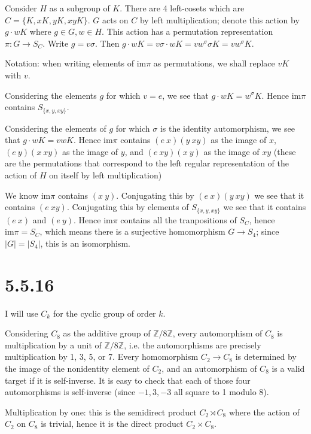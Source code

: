 \documentclass{article}
\def\Z{\mathbb{Z}}
\def\im{\textrm{im}}
\begin{document}
Consider $H$ as a subgroup of $K$. There are 4 left-cosets which are $C = \{K, xK, yK, xyK\}$. $G$ acts on $C$ by left multiplication; denote this action by $g \cdot wK$ where $g \in G, w \in H$. This action has a permutation representation $\pi : G \to S_C$. Write $g = v \sigma$. Then $g \cdot wK = v \sigma \cdot wK = vw^\sigma \sigma K = vw^\sigma K$. 

Notation: when writing elements of $\im \pi$ as permutations, we shall replace $vK$ with $v$.

Considering the elements $g$ for which $v = e$, we see that $g \cdot wK = w^\sigma K$. Hence $\im \pi$ contains $S_{\{x, y, xy\}}$.

Considering the elements of $g$ for which $\sigma$ is the identity automorphism, we see that $g \cdot wK = vwK$. Hence $\im \pi$ contains $(e\ x)(y\ xy)$ as the image of $x$, $(e\ y)(x\ xy)$ as the image of $y$, and $(e\ xy)(x\ y)$ as the image of $xy$ (these are the permutations that correspond to the left regular representation of the action of $H$ on itself by left multiplication)

We know $\im \pi$ contains $(x\ y)$. Conjugating this by $(e\ x)(y\ xy)$ we see that it contains $(e\ xy)$. Conjugating this by elements of $S_{\{x, y, xy\}}$ we see that it contains $(e\ x)$ and $(e\ y)$. Hence $\im \pi$ contains all the tranpositions of $S_C$, hence $\im \pi = S_C$, which means there is a surjective homomorphism $G \to S_4$; since $|G| = |S_4|$, this is an isomorphism.


\section*{5.5.16}

I will use $C_k$ for the cyclic group of order $k$.

Considering $C_8$ as the additive group of $\Z / 8 \Z$, every automorphism of $C_8$ is multiplication by a unit of $\Z / 8 \Z$, i.e. the automorphisms are precisely multiplication by 1, 3, 5, or 7. Every homomorphism $C_2 \to C_8$ is determined by the image of the nonidentity element of $C_2$, and an automorphism of $C_8$ is a valid target if it is self-inverse. It is easy to check that each of those four automorphisms is self-inverse (since $-1, 3, -3$ all square to 1 modulo 8).

Multiplication by one: this is the semidirect product $C_2 \rtimes C_8$ where the action of $C_2$ on $C_8$ is trivial, hence it is the direct product $C_2 \times C_8$.
\end{document}
